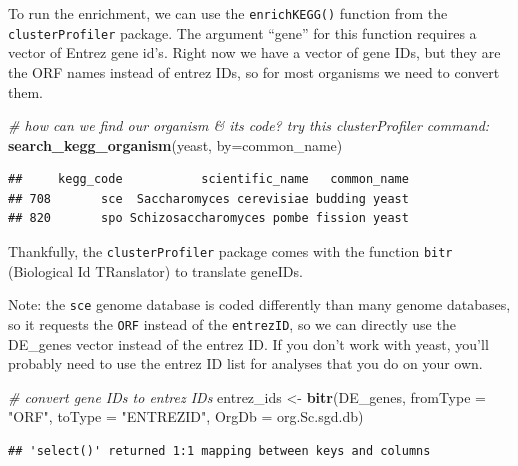 \documentclass[
]{book}
\newenvironment{Shaded}{\begin{snugshade}}{\end{snugshade}}
\newcommand{\AttributeTok}[1]{\textcolor[rgb]{0.13,0.29,0.53}{#1}}
\newcommand{\CommentTok}[1]{\textcolor[rgb]{0.56,0.35,0.01}{\textit{#1}}}
\newcommand{\FunctionTok}[1]{\textcolor[rgb]{0.13,0.29,0.53}{\textbf{#1}}}
\newcommand{\NormalTok}[1]{#1}
\newcommand{\OtherTok}[1]{\textcolor[rgb]{0.56,0.35,0.01}{#1}}
\newcommand{\StringTok}[1]{\textcolor[rgb]{0.31,0.60,0.02}{#1}}
\begin{document}
To run the enrichment, we can use the \texttt{enrichKEGG()} function from the \texttt{clusterProfiler} package. The argument ``gene'' for this function requires a vector of Entrez gene id's. Right now we have a vector of gene IDs, but they are the ORF names instead of entrez IDs, so for most organisms we need to convert them.

\begin{Shaded}
\begin{Highlighting}[]
\CommentTok{\# how can we find our organism \& its code? try this clusterProfiler command:}
\FunctionTok{search\_kegg\_organism}\NormalTok{(}\StringTok{\textquotesingle{}yeast\textquotesingle{}}\NormalTok{, }\AttributeTok{by=}\StringTok{\textquotesingle{}common\_name\textquotesingle{}}\NormalTok{)}
\end{Highlighting}
\end{Shaded}

\begin{verbatim}
##     kegg_code           scientific_name   common_name
## 708       sce  Saccharomyces cerevisiae budding yeast
## 820       spo Schizosaccharomyces pombe fission yeast
\end{verbatim}

Thankfully, the \texttt{clusterProfiler} package comes with the function \texttt{bitr} (Biological Id TRanslator) to translate geneIDs.

Note: the \texttt{sce} genome database is coded differently than many genome databases, so it requests the \texttt{ORF} instead of the \texttt{entrezID}, so we can directly use the DE\_genes vector instead of the entrez ID. If you don't work with yeast, you'll probably need to use the entrez ID list for analyses that you do on your own.

\begin{Shaded}
\begin{Highlighting}[]
\CommentTok{\# convert gene IDs to entrez IDs}
\NormalTok{entrez\_ids }\OtherTok{\textless{}{-}} \FunctionTok{bitr}\NormalTok{(DE\_genes, }\AttributeTok{fromType =} \StringTok{"ORF"}\NormalTok{, }\AttributeTok{toType =} \StringTok{"ENTREZID"}\NormalTok{, }\AttributeTok{OrgDb =}\NormalTok{ org.Sc.sgd.db)}
\end{Highlighting}
\end{Shaded}

\begin{verbatim}
## 'select()' returned 1:1 mapping between keys and columns
\end{verbatim}
\end{document}
